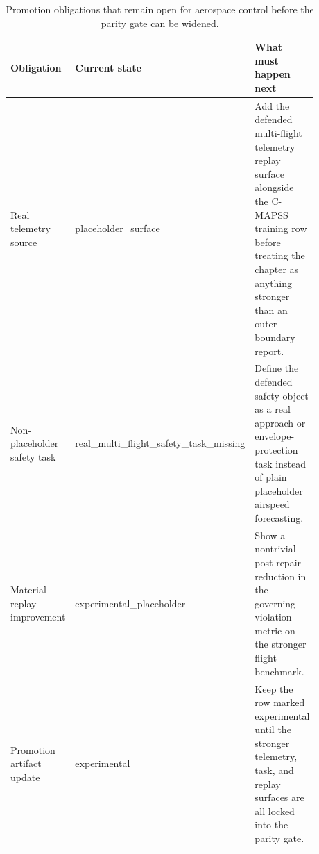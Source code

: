 \begin{table}[htbp]
\centering
\small
\caption{Promotion obligations that remain open for aerospace control before the parity gate can be widened.}
\label{tab:aerospace-promotion-obligations}
\begin{tabular}{p{0.24\linewidth}p{0.20\linewidth}p{0.44\linewidth}}
\toprule
\textbf{Obligation} & \textbf{Current state} & \textbf{What must happen next}\\
\midrule
Real telemetry source & placeholder\_surface & Add the defended multi-flight telemetry replay surface alongside the C-MAPSS training row before treating the chapter as anything stronger than an outer-boundary report.\\
Non-placeholder safety task & real\_multi\_flight\_safety\_task\_missing & Define the defended safety object as a real approach or envelope-protection task instead of plain placeholder airspeed forecasting.\\
Material replay improvement & experimental\_placeholder & Show a nontrivial post-repair reduction in the governing violation metric on the stronger flight benchmark.\\
Promotion artifact update & experimental & Keep the row marked experimental until the stronger telemetry, task, and replay surfaces are all locked into the parity gate.\\
\bottomrule
\end{tabular}
\end{table}
